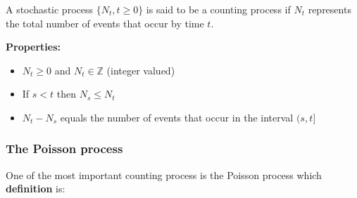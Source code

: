 A stochastic process $\{N_t,t\geq 0\}$ is said to be a counting process if $N_t$ represents the total number of events that occur by time $t$.

\textbf{Properties:}

\begin{itemize}
\item $N_t\geq 0$ and $N_t \in \mathbb{Z}$ (integer valued)
\item If $s<t$ then $N_s\leq N_t$
\item $N_t-N_s$ equals the number of events that occur in the interval $(s,t]$
\end{itemize}

\subsubsection{The Poisson process }

One of the most important counting process is the Poisson process which \textbf{definition} is:

